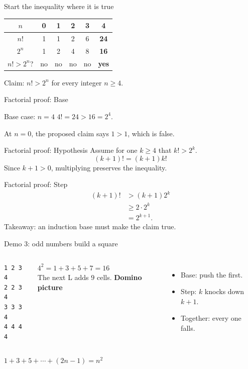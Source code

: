 \documentclass[aspectratio=169,10pt]{beamer}
\begin{document}
\begin{frame}{Start the inequality where it is true}
  \centering
  \begin{tabular}{c|ccccc}
    $n$ & 0 & 1 & 2 & 3 & \textbf{4}\\ \hline
    $n!$ & 1 & 1 & 2 & 6 & \textbf{24}\\
    $2^n$ & 1 & 2 & 4 & 8 & \textbf{16}\\
    $n!>2^n$? & no & no & no & no & \textbf{yes}
  \end{tabular}
  \vfill\large Claim: $n!>2^n$ for every integer $n\ge4$.
\end{frame}

\begin{frame}{Factorial proof: Base}
  \begin{block}{Base case: $n=4$}
    $4!=24>16=2^4$.
  \end{block}
  At $n=0$, the proposed claim says $1>1$, which is false.
\end{frame}

\begin{frame}{Factorial proof: Hypothesis}
  Assume for one $k\ge4$ that $k!>2^k$.
  \[
    (k+1)!=(k+1)k!
  \]
  Since $k+1>0$, multiplying preserves the inequality.
\end{frame}

\begin{frame}{Factorial proof: Step}
  \begin{align*}
    (k+1)!&>(k+1)2^k\\
          &\ge 2\cdot2^k\\
          &=2^{k+1}.
  \end{align*}
  \centering\Large Takeaway: an induction base must make the claim true.
\end{frame}

\begin{frame}[fragile]{Demo 3: odd numbers build a square}
  \begin{columns}[T]
      \centering\small
\begin{verbatim}
1 2 3 4
2 2 3 4
3 3 3 4
4 4 4 4
\end{verbatim}
      \centering\small $4^2=1+3+5+7=16$\\
      The next L adds $9$ cells.
      \textbf{Domino picture}
      \begin{itemize}
        \item Base: push the first.
        \item Step: $k$ knocks down $k+1$.
        \item Together: every one falls.
      \end{itemize}
  \end{columns}
  \vfill\centering $1+3+5+\cdots+(2n-1)=n^2$
\end{frame}
\end{document}
